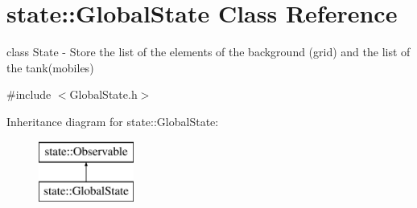 \hypertarget{classstate_1_1_global_state}{}\section{state\+:\+:Global\+State Class Reference}
\label{classstate_1_1_global_state}


class State -\/ Store the list of the elements of the background (grid) and the list of the tank(mobiles)  




{\ttfamily \#include $<$Global\+State.\+h$>$}

Inheritance diagram for state\+:\+:Global\+State\+:\begin{figure}[H]
\begin{center}
\leavevmode
\includegraphics[height=2.000000cm]{classstate_1_1_global_state}
\end{center}
\end{figure}
